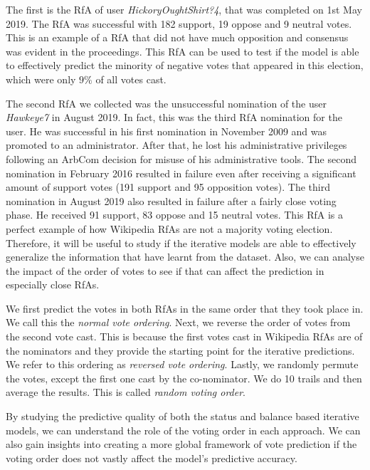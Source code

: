 The first is the RfA of user \textit{HickoryOughtShirt?4}, that was completed on 1st May 2019.
The RfA was successful with 182 support, 19 oppose and 9 neutral votes.
This is an example of a RfA that did not have much opposition and consensus was evident in the proceedings.
This RfA can be used to test if the model is able to effectively predict the minority of negative votes that appeared in this election, which were only $9\%$ of all votes cast.

The second RfA we collected was the unsuccessful nomination of the user \textit{Hawkeye7} in August 2019.
In fact, this was the third RfA nomination for the user.
He was successful in his first nomination in November 2009 and was promoted to an administrator.
After that, he lost his administrative privileges following an ArbCom decision for misuse of his administrative tools.
The second nomination in February 2016 resulted in failure even after receiving a significant amount of support votes (191 support and 95 opposition votes).
The third nomination in August 2019 also resulted in failure after a fairly close voting phase.
He received 91 support, 83 oppose and 15 neutral votes.
This RfA is a perfect example of how Wikipedia RfAs are not a majority voting election.
Therefore, it will be useful to study if the iterative models are able to effectively generalize the information that have learnt from the \wikirfa dataset.
Also, we can analyse the impact of the order of votes to see if that can affect the prediction in especially close RfAs.

We first predict the votes in both RfAs in the same order that they took place in.
We call this the \textit{normal vote ordering}.
Next, we reverse the order of votes from the second vote cast.
This is because the first votes cast in Wikipedia RfAs are of the nominators and they provide the starting point for the iterative predictions.
We refer to this ordering as \textit{reversed vote ordering}.
Lastly, we randomly permute the votes, except the first one cast by the co-nominator.
We do 10 trails and then average the results.
This is called \textit{random voting order}.

By studying the predictive quality of both the status and balance based iterative models, we can understand the role of the voting order in each approach.
We can also gain insights into creating a more global framework of vote prediction if the voting order does not vastly affect the model's predictive accuracy.



